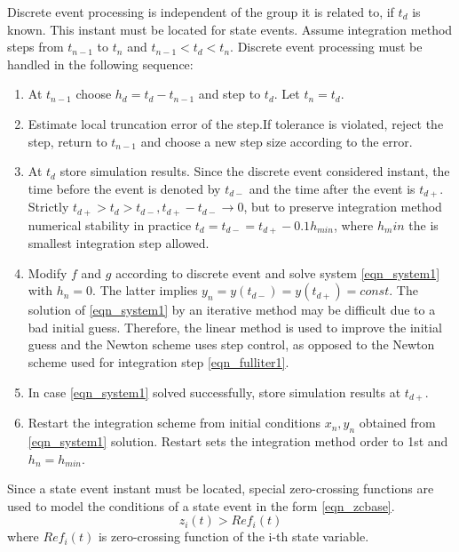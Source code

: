 \documentclass[lettersize,journal]{IEEEtran}
\begin{document}
Discrete event processing is independent of the group it is related to, if \(t_d\) is known. This instant must be located for state events. Assume integration method steps from \(t_{n-1}\) to \(t_n\) and \(t_{n-1}<t_d<t_n\). Discrete event processing must be handled in the following sequence:
\begin{enumerate}
	\item At \(t_{n-1}\) choose \(h_d=t_d-t_{n-1}\) and step to \(t_d\). Let \(t_n=t_d\).
	\item Estimate local truncation error of the step.If tolerance is violated, reject the step, return to \(t_{n-1}\) and choose a new step size according to the error.
	\item At \(t_d\) store simulation results. Since the discrete event considered instant, the time before the event is denoted by \(t_{d-}\) and the time after the event is \(t_{d+}\). Strictly \(t_{d+}>t_d>t_{d-},  t_{d+}-t_{d-} \rightarrow 0\), but to preserve integration method numerical stability in practice \(t_d=t_{d-} = t_{d+}-0.1h_{min}\), where \(h_min\) the is smallest integration step allowed.
	\item Modify \(f\) and \(g\) according to discrete event and solve system \eqref{eqn_system1} with \(h_n=0\). The latter implies \(y_n=y(t_{d-})=y(t_{d+})=const\). The solution of \eqref{eqn_system1}  by an iterative method may be difficult due to a bad initial guess. Therefore, the linear method is used to improve the initial guess and the Newton scheme uses step control, as opposed to the Newton scheme used for integration step \eqref{eqn_fulliter1}.
	\item In case \eqref{eqn_system1} solved successfully, store simulation results at \(t_{d+}\).
	\item Restart the integration scheme from initial conditions \(x_n, y_n\) obtained from \eqref{eqn_system1} solution. Restart sets the integration method order to 1st and \(h_n=h_{min}\).
\end{enumerate}
Since a state event instant must be located, special zero-crossing functions are used to model the conditions of a state event in the form \eqref{eqn_zcbase}.
\begin{equation}
	\label{eqn_zcbase}
	z_i(t) > Ref_i(t)
\end{equation}
\noindent where \(Ref_i(t)\) is zero-crossing function of the i-th state variable.
\end{document}
